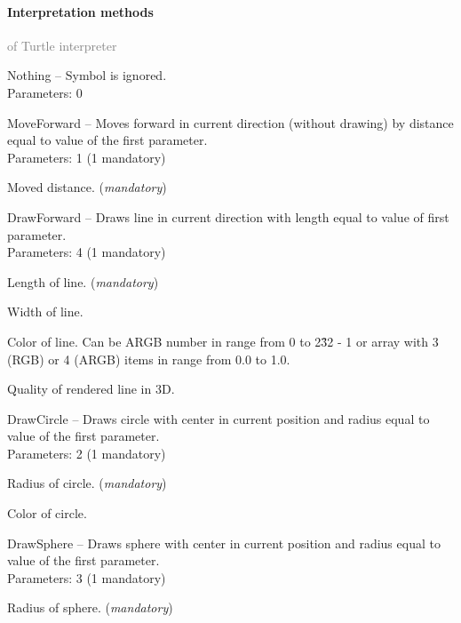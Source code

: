 	\paragraph{Interpretation methods}\textcolor{gray}{of Turtle interpreter}
	\begin{description*}
		\item[Nothing]
			-- Symbol is ignored.
		\\ Parameters: 0 
		\item[MoveForward]
			-- Moves forward in current direction (without drawing) by distance equal to value of the first parameter.
		\\ Parameters: 1  (1 mandatory) 
			\begin{enumerate*}
				\item
Moved distance. (\textit{mandatory}) 			\end{enumerate*}
		\item[DrawForward]
			-- Draws line in current direction with length equal to value of first parameter.
		\\ Parameters: 4  (1 mandatory) 
			\begin{enumerate*}
				\item
Length of line. (\textit{mandatory}) 				\item
            Width of line.				\item
            Color of line. Can be ARGB number in range from 0 to 2\^32 - 1 or array with 3 (RGB) or 4 (ARGB) items in range from 0.0 to 1.0.				\item
            Quality of rendered line in 3D.			\end{enumerate*}
		\item[DrawCircle]
			-- Draws circle with center in current position and radius equal to value of the first parameter.
		\\ Parameters: 2  (1 mandatory) 
			\begin{enumerate*}
				\item
Radius of circle. (\textit{mandatory}) 				\item
            Color of circle.			\end{enumerate*}
		\item[DrawSphere]
			-- Draws sphere with center in current position and radius equal to value of the first parameter.
		\\ Parameters: 3  (1 mandatory) 
			\begin{enumerate*}
				\item
Radius of sphere. (\textit{mandatory}) 				\item

\end{enumerate*}
\end{description*}
